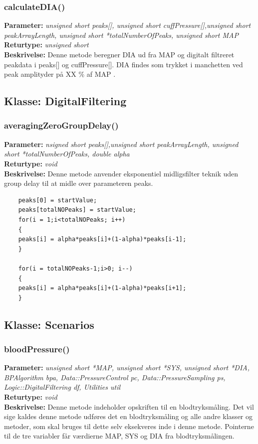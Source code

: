 \subsubsection{calculateDIA()}
\textbf{Parameter: } \textit{unsigned short peaks[], unsigned short cuffPressure[],unsigned short peakArrayLength, unsigned short *totalNumberOfPeaks, unsigned short MAP}
\\ \textbf{Returtype: } \textit{unsigned short}
\\ \textbf{Beskrivelse: } Denne metode beregner DIA ud fra MAP og digitalt filtreret peakdata i peaks[] og cuffPressure[]. DIA findes som trykket i manchetten ved peak amplityder på XX \% af MAP .

\subsection{Klasse: DigitalFiltering}

\subsubsection{averagingZeroGroupDelay()}
\textbf{Parameter: } \textit{nsigned short peaks[],unsigned short peakArrayLength, unsigned short *totalNumberOfPeaks, double alpha}
\\ \textbf{Returtype: } \textit{void}
\\ \textbf{Beskrivelse: } Denne metode anvender eksponentiel midligsfilter teknik uden group delay til at midle over parameteren peaks.
\begin{lstlisting}
	peaks[0] = startValue;
	peaks[totalNOPeaks] = startValue;
	for(i = 1;i<totalNOPeaks; i++)
	{
	peaks[i] = alpha*peaks[i]+(1-alpha)*peaks[i-1];
	}
	
	for(i = totalNOPeaks-1;i>0; i--)
	{
	peaks[i] = alpha*peaks[i]+(1-alpha)*peaks[i+1];
	}
\end{lstlisting}

\subsection{Klasse: Scenarios}

\subsubsection{bloodPressure()}
\textbf{Parameter: } \textit{unsigned short *MAP, unsigned short *SYS, unsigned short *DIA, BPAlgorithm bpa, Data::PressureControl pc, Data::PressureSampling ps, Logic::DigitalFiltering df, Utilities util}
\\ \textbf{Returtype: } \textit{void}
\\ \textbf{Beskrivelse: } Denne metode indeholder opskriften til en blodtryksmåling. Det vil sige kaldes denne metode udføres det en blodtryksmåling og alle andre klasser og metoder, som skal bruges til dette selv eksekveres inde i denne metode. Pointerne til de tre variabler får værdierne MAP, SYS og DIA fra blodtryksmålingen.

